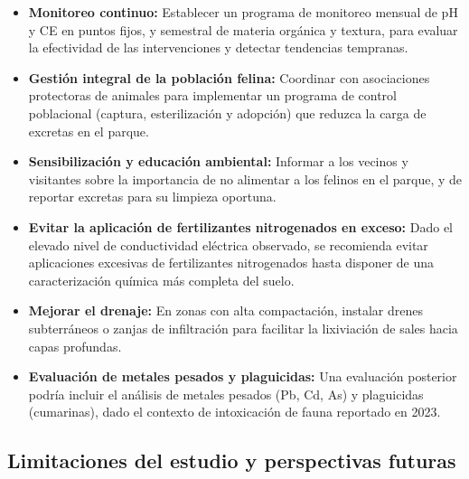 \documentclass[fleqn]{jaes}
\begin{document}
\begin{itemize}
  \item \textbf{Monitoreo continuo:} Establecer un programa de monitoreo mensual de pH y CE en puntos fijos, y semestral de materia orgánica y textura, para evaluar la efectividad de las intervenciones y detectar tendencias tempranas.
  \item \textbf{Gestión integral de la población felina:} Coordinar con asociaciones protectoras de animales para implementar un programa de control poblacional (captura, esterilización y adopción) que reduzca la carga de excretas en el parque.
  \item \textbf{Sensibilización y educación ambiental:} Informar a los vecinos y visitantes sobre la importancia de no alimentar a los felinos en el parque, y de reportar excretas para su limpieza oportuna.
  \item \textbf{Evitar la aplicación de fertilizantes nitrogenados en exceso:} Dado el elevado nivel de conductividad eléctrica observado, se recomienda evitar aplicaciones excesivas de fertilizantes nitrogenados hasta disponer de una caracterización química más completa del suelo.
  \item \textbf{Mejorar el drenaje:} En zonas con alta compactación, instalar drenes subterráneos o zanjas de infiltración para facilitar la lixiviación de sales hacia capas profundas.
  \item \textbf{Evaluación de metales pesados y plaguicidas:} Una evaluación posterior podría incluir el análisis de metales pesados (Pb, Cd, As) y plaguicidas (cumarinas), dado el contexto de intoxicación de fauna reportado en 2023.
\end{itemize}

\subsection{Limitaciones del estudio y perspectivas futuras}\label{subsec:limitaciones_generales}
\end{document}
